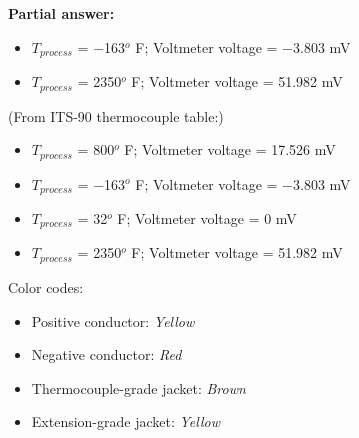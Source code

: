 





\noindent
{\bf Partial answer:}

\begin{itemize}
\item{} $T_{process}$ = $-$163$^{o}$ F; Voltmeter voltage = $-$3.803 mV 
\item{} $T_{process}$ = 2350$^{o}$ F; Voltmeter voltage = 51.982 mV 
\end{itemize}







(From ITS-90 thermocouple table:)

\begin{itemize}
\item{} $T_{process}$ = 800$^{o}$ F; Voltmeter voltage = 17.526 mV 
\item{} $T_{process}$ = $-$163$^{o}$ F; Voltmeter voltage = $-$3.803 mV 
\item{} $T_{process}$ = 32$^{o}$ F; Voltmeter voltage = 0 mV 
\item{} $T_{process}$ = 2350$^{o}$ F; Voltmeter voltage = 51.982 mV 
\end{itemize}

\vskip 10pt

Color codes:

\begin{itemize}
\item{} Positive conductor: {\it Yellow}
\item{} Negative conductor: {\it Red}
\item{} Thermocouple-grade jacket: {\it Brown}
\item{} Extension-grade jacket: {\it Yellow}
\end{itemize}




